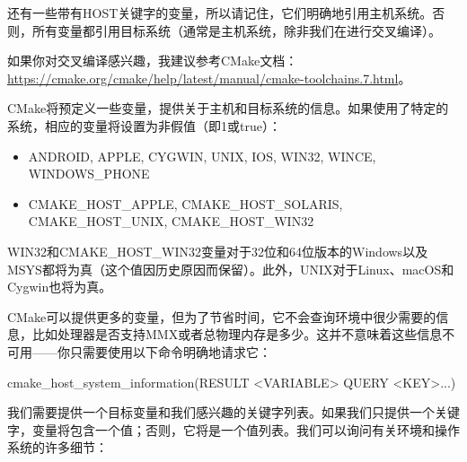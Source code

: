 还有一些带有HOST关键字的变量，所以请记住，它们明确地引用主机系统。否则，所有变量都引用目标系统（通常是主机系统，除非我们在进行交叉编译）。

如果你对交叉编译感兴趣，我建议参考CMake文档：\url{https://cmake.org/cmake/help/latest/manual/cmake-toolchains.7.html}。


CMake将预定义一些变量，提供关于主机和目标系统的信息。如果使用了特定的系统，相应的变量将设置为非假值（即1或true）：

\begin{itemize}
\item
ANDROID, APPLE, CYGWIN, UNIX, IOS, WIN32, WINCE, WINDOWS\_PHONE

\item
CMAKE\_HOST\_APPLE, CMAKE\_HOST\_SOLARIS, CMAKE\_HOST\_UNIX, CMAKE\_HOST\_WIN32
\end{itemize}

WIN32和CMAKE\_HOST\_WIN32变量对于32位和64位版本的Windows以及MSYS都将为真（这个值因历史原因而保留）。此外，UNIX对于Linux、macOS和Cygwin也将为真。


CMake可以提供更多的变量，但为了节省时间，它不会查询环境中很少需要的信息，比如处理器是否支持MMX或者总物理内存是多少。这并不意味着这些信息不可用——你只需要使用以下命令明确地请求它：

\begin{shell}
cmake_host_system_information(RESULT <VARIABLE> QUERY <KEY>...)
\end{shell}

我们需要提供一个目标变量和我们感兴趣的关键字列表。如果我们只提供一个关键字，变量将包含一个值；否则，它将是一个值列表。我们可以询问有关环境和操作系统的许多细节：

